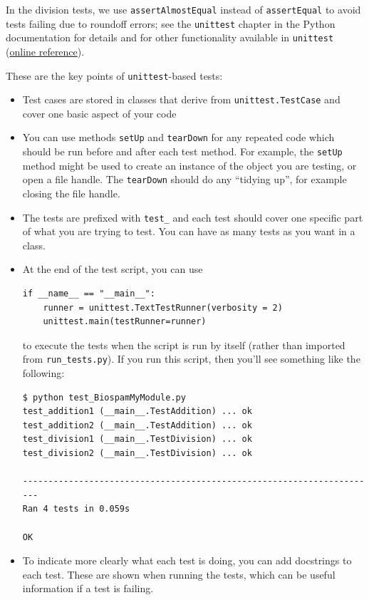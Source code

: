 \documentclass{report}
\begin{document}
In the division tests, we use \verb|assertAlmostEqual| instead of \verb|assertEqual| to avoid tests failing due to roundoff errors; see the \verb|unittest| chapter in the Python documentation for details and for other functionality available in \verb|unittest| (\href{http://docs.python.org/library/unittest.html}{online reference}).

These are the key points of \verb|unittest|-based tests:

\begin{itemize}
  \item Test cases are stored in classes that derive from
    \verb|unittest.TestCase| and cover one basic aspect of your code
    
  \item You can use methods \verb|setUp| and \verb|tearDown| for any repeated
    code which should be run before and after each test method.  For example,
    the \verb|setUp| method might be used to create an instance of the object
    you are testing, or open a file handle.  The \verb|tearDown| should do any
    ``tidying up'', for example closing the file handle.

  \item The tests are prefixed with \verb|test_| and each test should cover
    one specific part of what you are trying to test. You can have as
    many tests as you want in a class.

  \item At the end of the test script, you can use
\begin{verbatim}
if __name__ == "__main__":
    runner = unittest.TextTestRunner(verbosity = 2)
    unittest.main(testRunner=runner)
\end{verbatim}
        to execute the tests when the script is run by itself (rather than
        imported from \verb|run_tests.py|).
        If you run this script, then you'll see something like the following:

\begin{verbatim}
$ python test_BiospamMyModule.py
test_addition1 (__main__.TestAddition) ... ok
test_addition2 (__main__.TestAddition) ... ok
test_division1 (__main__.TestDivision) ... ok
test_division2 (__main__.TestDivision) ... ok

----------------------------------------------------------------------
Ran 4 tests in 0.059s

OK
\end{verbatim}

  \item To indicate more clearly what each test is doing, you can add
        docstrings to each test.  These are shown when running the tests,
        which can be useful information if a test is failing.


\end{itemize}
\end{document}
